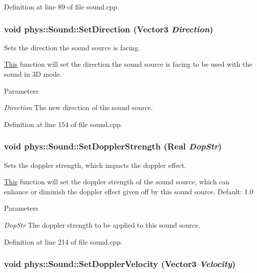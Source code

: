Definition at line 89 of file sound.cpp.

\hypertarget{classphys_1_1Sound_af2d6aa7e1b3b2e9f60b8dbbe8aa2d381}{
\subsubsection[{SetDirection}]{\setlength{\rightskip}{0pt plus 5cm}void phys::Sound::SetDirection ({\bf Vector3} {\em Direction})}}
\label{dc/d2f/classphys_1_1Sound_af2d6aa7e1b3b2e9f60b8dbbe8aa2d381}


Sets the direction the sound source is facing. 

\hyperlink{structThis}{This} function will set the direction the sound source is facing to be used with the sound in 3D mode. 
\begin{DoxyParams}{Parameters}
\item[{\em Direction}]The new direction of the sound source. \end{DoxyParams}


Definition at line 154 of file sound.cpp.

\hypertarget{classphys_1_1Sound_a159a5ac92577b55e86a8fc2dbf8bc806}{
\subsubsection[{SetDopplerStrength}]{\setlength{\rightskip}{0pt plus 5cm}void phys::Sound::SetDopplerStrength ({\bf Real} {\em DopStr})}}
\label{dc/d2f/classphys_1_1Sound_a159a5ac92577b55e86a8fc2dbf8bc806}


Sets the doppler strength, which impacts the doppler effect. 

\hyperlink{structThis}{This} function will set the doppler strength of the sound source, which can enhance or diminish the doppler effect given off by this sound source. Default: 1.0 
\begin{DoxyParams}{Parameters}
\item[{\em DopStr}]The doppler strength to be applied to this sound source. \end{DoxyParams}


Definition at line 214 of file sound.cpp.

\hypertarget{classphys_1_1Sound_a5a7f337dbc533f49269f736f51d25b85}{
\subsubsection[{SetDopplerVelocity}]{\setlength{\rightskip}{0pt plus 5cm}void phys::Sound::SetDopplerVelocity ({\bf Vector3} {\em Velocity})}}
\label{dc/d2f/classphys_1_1Sound_a5a7f337dbc533f49269f736f51d25b85}



